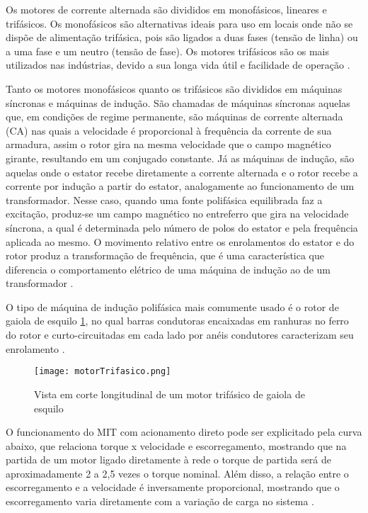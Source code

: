 			Os motores de corrente alternada são divididos em monofásicos, lineares e trifásicos. Os monofásicos são alternativas ideais para uso em locais onde não se dispõe de alimentação trifásica, pois são ligados a duas fases (tensão de linha) ou a uma fase e um neutro (tensão de fase). Os motores trifásicos são os mais utilizados nas indústrias, devido a sua longa vida útil e facilidade de operação \cite{WEGMotorEletrico}.

			Tanto os motores monofásicos quanto os trifásicos são divididos em máquinas síncronas e máquinas de indução. São chamadas de máquinas síncronas aquelas que, em condições de regime permanente, são máquinas de corrente alternada (CA) nas quais a velocidade é proporcional à frequência da corrente de sua armadura, assim o rotor gira na mesma velocidade que o campo magnético girante, resultando em um conjugado constante. Já as máquinas de indução, são aquelas onde o estator recebe diretamente a corrente alternada e o rotor recebe a corrente por indução a partir do estator, analogamente ao funcionamento de um transformador. Nesse caso, quando uma fonte polifásica equilibrada faz a excitação, produz-se um campo magnético no entreferro que gira na velocidade síncrona, a qual é determinada pelo número de polos do estator e pela frequência aplicada ao mesmo. O movimento relativo entre os enrolamentos do estator e do rotor produz a transformação de frequência, que é uma característica que diferencia o comportamento elétrico de uma máquina de indução ao de um transformador \cite{Fitzgerald}.

			O tipo de máquina de indução polifásica mais comumente usado é o rotor de gaiola de esquilo \ref{motorTrifasico}, no qual barras condutoras encaixadas em ranhuras no ferro do rotor e curto-circuitadas em cada lado por anéis condutores caracterizam seu enrolamento \cite{Fitzgerald}.

			\begin{figure}[!h]
				\centering
				\texttt{[image: motorTrifasico.png]}
				\caption[Vista em corte longitudinal de um motor trifásico de gaiola de esquilo]{Vista em corte longitudinal de um motor trifásico de gaiola de esquilo \cite{Rockwell}} 
				\label{motorTrifasico}
			\end{figure}

			O funcionamento do MIT com acionamento direto pode ser explicitado pela curva abaixo, que relaciona torque x velocidade e escorregamento, mostrando que na partida de um motor ligado diretamente à rede o torque de partida será de aproximadamente 2 a 2,5 vezes o torque nominal. Além disso, a relação entre o escorregamento e a velocidade é inversamente proporcional, mostrando que o escorregamento varia diretamente com a variação de carga no sistema \cite{FitzgeraldETAL}.

